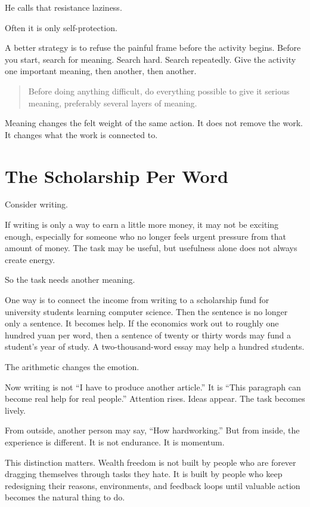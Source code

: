 He calls that resistance laziness.

Often it is only self-protection.

A better strategy is to refuse the painful frame before the activity begins. Before you start, search for meaning. Search hard. Search repeatedly. Give the activity one important meaning, then another, then another.

\begin{quote}
Before doing anything difficult, do everything possible to give it serious meaning, preferably several layers of meaning.
\end{quote}

Meaning changes the felt weight of the same action. It does not remove the work. It changes what the work is connected to.

\section*{The Scholarship Per Word}

Consider writing.

If writing is only a way to earn a little more money, it may not be exciting enough, especially for someone who no longer feels urgent pressure from that amount of money. The task may be useful, but usefulness alone does not always create energy.

So the task needs another meaning.

One way is to connect the income from writing to a scholarship fund for university students learning computer science. Then the sentence is no longer only a sentence. It becomes help. If the economics work out to roughly one hundred yuan per word, then a sentence of twenty or thirty words may fund a student's year of study. A two-thousand-word essay may help a hundred students.

The arithmetic changes the emotion.

Now writing is not ``I have to produce another article.'' It is ``This paragraph can become real help for real people.'' Attention rises. Ideas appear. The task becomes lively.

From outside, another person may say, ``How hardworking.'' But from inside, the experience is different. It is not endurance. It is momentum.

This distinction matters. Wealth freedom is not built by people who are forever dragging themselves through tasks they hate. It is built by people who keep redesigning their reasons, environments, and feedback loops until valuable action becomes the natural thing to do.

